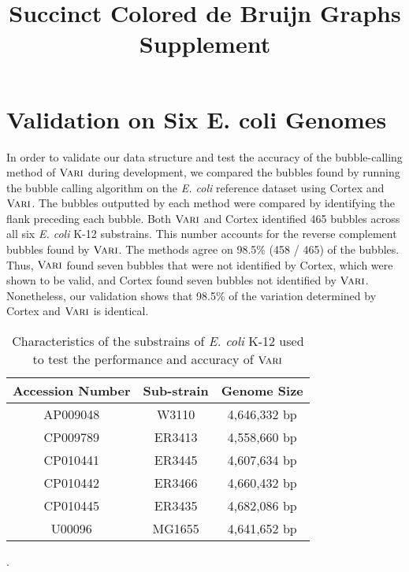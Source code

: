 \documentclass{article}
\title{Succinct Colored de Bruijn Graphs Supplement}
\def\ours{\mbox{\rm {\sc Vari}}}
\begin{document}
\maketitle
\section{Validation on Six E. coli Genomes}

In order to validate our data structure and test the accuracy of the bubble-calling method of $\ours$ during development, we compared the bubbles found by running the bubble calling algorithm on the \emph{E. coli} reference dataset using {\sc Cortex} and $\ours$.  The bubbles outputted by each method were compared by identifying the flank preceding each bubble.  Both $\ours$ and {\sc Cortex} identified 465 bubbles across all six \emph{E. coli} K-12 substrains.  This number accounts for the reverse complement bubbles found by $\ours$. The methods agree on 98.5\% (458 / 465) of the bubbles. Thus, $\ours$ found seven bubbles that were not identified by {\sc Cortex}, which were shown to be valid, and {\sc Cortex} found seven bubbles not identified by $\ours$.
Nonetheless, our validation shows that 98.5\% of the variation determined by {\sc Cortex} and $\ours$ is identical.



\begin{table}[h!]
  \small
  \centering
  \begin{tabular}{c|c|c}
		{\bf Accession Number}		& {\bf Sub-strain}	& {\bf Genome Size} 	 \\
	\hline
	\hline
	AP009048 & W3110  & 4,646,332 bp \\
	CP009789 & ER3413 & 4,558,660 bp \\
	CP010441 & ER3445 & 4,607,634 bp \\
	CP010442 & ER3466 & 4,660,432 bp \\
	CP010445 & ER3435 & 4,682,086 bp \\ 
	U00096   & MG1655 & 4,641,652 bp\\
 	\end{tabular}
      \caption{Characteristics of the substrains of \emph{E. coli} K-12 used to test the performance and accuracy of $\ours$}.
 \label{tbl-ecoli}
\end{table}
\end{document}
